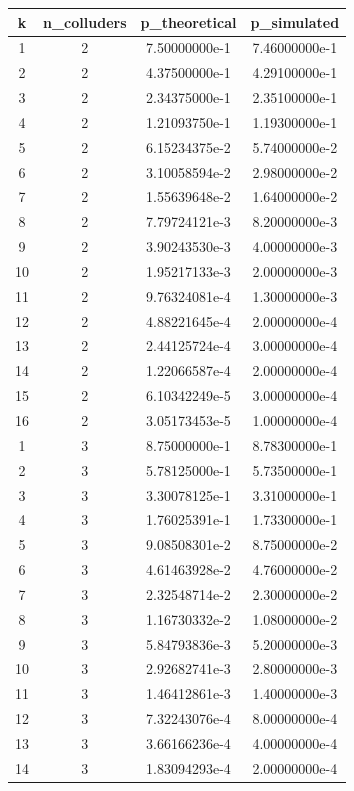 \begin{table}[h]
\centering
\begin{tabular}{|c|c|c|c|}
\hline
k & n_colluders & p_theoretical & p_simulated \\ \hline
1 & 2 & 7.50000000e-1 & 7.46000000e-1 \\
2 & 2 & 4.37500000e-1 & 4.29100000e-1 \\
3 & 2 & 2.34375000e-1 & 2.35100000e-1 \\
4 & 2 & 1.21093750e-1 & 1.19300000e-1 \\
5 & 2 & 6.15234375e-2 & 5.74000000e-2 \\
6 & 2 & 3.10058594e-2 & 2.98000000e-2 \\
7 & 2 & 1.55639648e-2 & 1.64000000e-2 \\
8 & 2 & 7.79724121e-3 & 8.20000000e-3 \\
9 & 2 & 3.90243530e-3 & 4.00000000e-3 \\
10 & 2 & 1.95217133e-3 & 2.00000000e-3 \\
11 & 2 & 9.76324081e-4 & 1.30000000e-3 \\
12 & 2 & 4.88221645e-4 & 2.00000000e-4 \\
13 & 2 & 2.44125724e-4 & 3.00000000e-4 \\
14 & 2 & 1.22066587e-4 & 2.00000000e-4 \\
15 & 2 & 6.10342249e-5 & 3.00000000e-4 \\
16 & 2 & 3.05173453e-5 & 1.00000000e-4 \\
1 & 3 & 8.75000000e-1 & 8.78300000e-1 \\
2 & 3 & 5.78125000e-1 & 5.73500000e-1 \\
3 & 3 & 3.30078125e-1 & 3.31000000e-1 \\
4 & 3 & 1.76025391e-1 & 1.73300000e-1 \\
5 & 3 & 9.08508301e-2 & 8.75000000e-2 \\
6 & 3 & 4.61463928e-2 & 4.76000000e-2 \\
7 & 3 & 2.32548714e-2 & 2.30000000e-2 \\
8 & 3 & 1.16730332e-2 & 1.08000000e-2 \\
9 & 3 & 5.84793836e-3 & 5.20000000e-3 \\
10 & 3 & 2.92682741e-3 & 2.80000000e-3 \\
11 & 3 & 1.46412861e-3 & 1.40000000e-3 \\
12 & 3 & 7.32243076e-4 & 8.00000000e-4 \\
13 & 3 & 3.66166236e-4 & 4.00000000e-4 \\
14 & 3 & 1.83094293e-4 & 2.00000000e-4 \\

\end{tabular}
\end{table}

